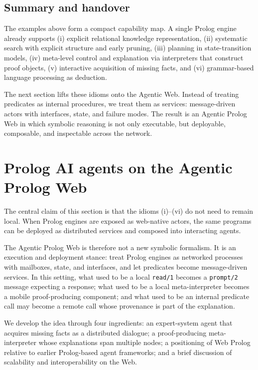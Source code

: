 \subsection{Summary and handover}

The examples above form a compact capability map. A single Prolog engine already supports (i) explicit relational knowledge representation, (ii) systematic search with explicit structure and early pruning, (iii) planning in state-transition models, (iv) meta-level control and explanation via interpreters that construct proof objects, (v) interactive acquisition of missing facts, and (vi) grammar-based language processing as deduction.

The next section lifts these idioms onto the Agentic Web. Instead of treating predicates as internal procedures, we treat them as services: message-driven actors with interfaces, state, and failure modes. The result is an Agentic Prolog Web in which symbolic reasoning is not only executable, but deployable, composable, and inspectable across the network.

\section{Prolog AI agents on the Agentic Prolog Web}
\label{sec:prolog-web-agents}

The central claim of this section is that the idioms (i)--(vi) do not need to remain local. When Prolog engines are exposed as web-native actors, the same programs can be deployed as distributed services and composed into interacting agents.

The Agentic Prolog Web is therefore not a new symbolic formalism. It is an execution and deployment stance: treat Prolog engines as networked processes with mailboxes, state, and interfaces, and let predicates become message-driven services. In this setting, what used to be a local \texttt{read/1} becomes a \texttt{prompt/2} message expecting a response; what used to be a local meta-interpreter becomes a mobile proof-producing component; and what used to be an internal predicate call may become a remote call whose provenance is part of the explanation.

We develop the idea through four ingredients: an expert-system agent that acquires missing facts as a distributed dialogue; a proof-producing meta-interpreter whose explanations span multiple nodes; a positioning of Web Prolog relative to earlier Prolog-based agent frameworks; and a brief discussion of scalability and interoperability on the Web.

